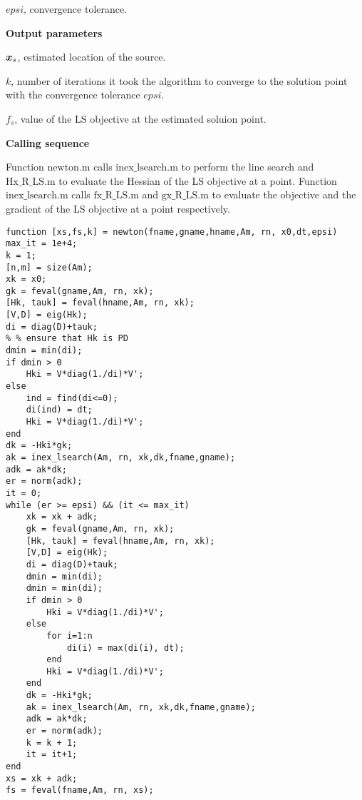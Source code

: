 \noindent
$epsi$, convergence tolerance.

\noindent
\textbf{Output parameters}

\noindent
$\mbox{\boldmath$x$}_s$, estimated location of the source.

\noindent
$k$, number of iterations it took the algorithm to  converge to the solution point with the convergence tolerance $epsi$.

\noindent
$f_s$, value of the LS objective at the estimated soluion point.

\noindent
\textbf{Calling sequence}

\noindent
Function $\mbox{newton.m}$ calls $\mbox{inex\_lsearch.m}$ to perform the line search and $\mbox{Hx\_R\_LS.m}$ to evaluate the Hessian of the LS objective at a point. Function $\mbox{inex\_lsearch.m}$ calls $\mbox{fx\_R\_LS.m}$ and $\mbox{gx\_R\_LS.m}$ to evaluate the objective and the gradient of the LS objective at a point respectively.  

\phantom{m}

\begin{lstlisting}
function [xs,fs,k] = newton(fname,gname,hname,Am, rn, x0,dt,epsi)
max_it = 1e+4;
k = 1;
[n,m] = size(Am);
xk = x0;
gk = feval(gname,Am, rn, xk);
[Hk, tauk] = feval(hname,Am, rn, xk);
[V,D] = eig(Hk);
di = diag(D)+tauk;
% % ensure that Hk is PD
dmin = min(di);
if dmin > 0
    Hki = V*diag(1./di)*V';
else
    ind = find(di<=0);
    di(ind) = dt;
    Hki = V*diag(1./di)*V';
end
dk = -Hki*gk;
ak = inex_lsearch(Am, rn, xk,dk,fname,gname);
adk = ak*dk;
er = norm(adk);
it = 0;
while (er >= epsi) && (it <= max_it)
    xk = xk + adk;
    gk = feval(gname,Am, rn, xk);
    [Hk, tauk] = feval(hname,Am, rn, xk);
    [V,D] = eig(Hk);
    di = diag(D)+tauk;
    dmin = min(di);
    dmin = min(di);
    if dmin > 0
        Hki = V*diag(1./di)*V';
    else
        for i=1:n
            di(i) = max(di(i), dt);
        end
        Hki = V*diag(1./di)*V';
    end
    dk = -Hki*gk;
    ak = inex_lsearch(Am, rn, xk,dk,fname,gname);
    adk = ak*dk;
    er = norm(adk);
    k = k + 1;
    it = it+1;
end
xs = xk + adk;
fs = feval(fname,Am, rn, xs);
\end{lstlisting}


